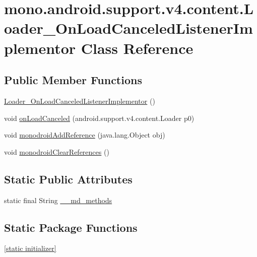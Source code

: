 \hypertarget{classmono_1_1android_1_1support_1_1v4_1_1content_1_1_loader___on_load_canceled_listener_implementor}{
\section{mono.android.support.v4.content.Loader\_\-OnLoadCanceledListenerImplementor Class Reference}
\label{classmono_1_1android_1_1support_1_1v4_1_1content_1_1_loader___on_load_canceled_listener_implementor}
}
\subsection*{Public Member Functions}
\begin{CompactItemize}
\item 
\hyperlink{classmono_1_1android_1_1support_1_1v4_1_1content_1_1_loader___on_load_canceled_listener_implementor_128736c7894441300bf507febd941728}{Loader\_\-OnLoadCanceledListenerImplementor} ()
\item 
void \hyperlink{classmono_1_1android_1_1support_1_1v4_1_1content_1_1_loader___on_load_canceled_listener_implementor_30211744da81687fe1fcdea96162b15d}{onLoadCanceled} (android.support.v4.content.Loader p0)
\item 
void \hyperlink{classmono_1_1android_1_1support_1_1v4_1_1content_1_1_loader___on_load_canceled_listener_implementor_5e5e1c8f0bda08b7e26819e4ee995873}{monodroidAddReference} (java.lang.Object obj)
\item 
void \hyperlink{classmono_1_1android_1_1support_1_1v4_1_1content_1_1_loader___on_load_canceled_listener_implementor_4eb6431594cba99ef29e0a08f9fb6904}{monodroidClearReferences} ()
\end{CompactItemize}
\subsection*{Static Public Attributes}
\begin{CompactItemize}
\item 
static final String \hyperlink{classmono_1_1android_1_1support_1_1v4_1_1content_1_1_loader___on_load_canceled_listener_implementor_1fb91411ee004f227bd993fdfb4f4747}{\_\-\_\-md\_\-methods}
\end{CompactItemize}
\subsection*{Static Package Functions}
\begin{CompactItemize}
\item 
\hyperlink{classmono_1_1android_1_1support_1_1v4_1_1content_1_1_loader___on_load_canceled_listener_implementor_03b5e36f499c9393af05fa6fe9ffe664}{\mbox{[}static initializer\mbox{]}}
\end{CompactItemize}

